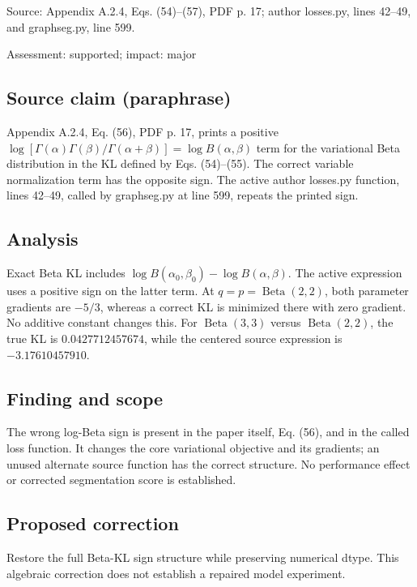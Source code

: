 \documentclass[11pt]{article}
\begin{document}
Source: Appendix A.2.4, Eqs. (54)–(57), PDF p. 17; author losses.py, lines 42–49, and graphseg.py, line 599.

Assessment: supported; impact: major

\subsection*{Source claim (paraphrase)}

Appendix A.2.4, Eq. (56), PDF p. 17, prints a positive \(\log[\Gamma(\alpha)\Gamma(\beta)/\Gamma(\alpha+\beta)]=\log B(\alpha,\beta)\) term for the variational Beta distribution in the KL defined by Eqs. (54)–(55). The correct variable normalization term has the opposite sign. The active author losses.py function, lines 42–49, called by graphseg.py at line 599, repeats the printed sign.

\subsection*{Analysis}

Exact Beta KL includes \(\log B(\alpha_0,\beta_0)-\log B(\alpha,\beta)\). The active expression uses a positive sign on the latter term. At \(q=p=\operatorname{Beta}(2,2)\), both parameter gradients are \(-5/3\), whereas a correct KL is minimized there with zero gradient. No additive constant changes this. For \(\operatorname{Beta}(3,3)\) versus \(\operatorname{Beta}(2,2)\), the true KL is \(0.0427712457674\), while the centered source expression is \(-3.17610457910\).

\subsection*{Finding and scope}

The wrong log-Beta sign is present in the paper itself, Eq. (56), and in the called loss function. It changes the core variational objective and its gradients; an unused alternate source function has the correct structure. No performance effect or corrected segmentation score is established.

\subsection*{Proposed correction}

Restore the full Beta-KL sign structure while preserving numerical dtype. This algebraic correction does not establish a repaired model experiment.
\end{document}
